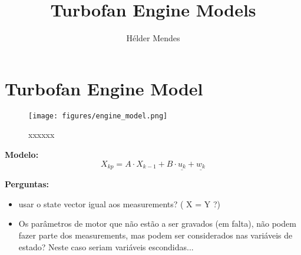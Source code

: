 \documentclass[12pt,a4paper]{article}
\author{Hélder Mendes}
\title{Turbofan Engine Models}
\begin{document}
\section{Turbofan Engine Model }



\begin{figure}[ht]
\begin{center}
\texttt{[image: figures/engine\_model.png]}
\caption{xxxxxx}
\end{center}
\end{figure}

\textbf{Modelo:} \\


\begin{equation}
X_{kp} = A \cdot X_{k-1} + B \cdot \underline{u_{k}} + \underline{w_{k}}
\label{new_prediction}
\end{equation}

\vspace{2cm}

\textbf{Perguntas:} 

\begin{itemize}
\item usar o state vector igual aos measurements? ( X = Y ?) 
\item Os parâmetros de motor que não estão a ser gravados (em falta), não podem fazer parte dos measurements, mas podem ser considerados nas variáveis de estado? Neste caso seriam variáveis escondidas...
\end{itemize}
\end{document}
